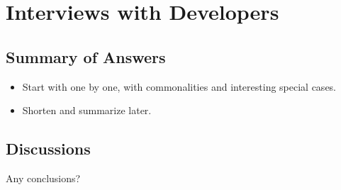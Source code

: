 \chapter{Interviews with Developers}
\label{ch_interviews}

\section{Summary of Answers}

\begin{itemize}
\item Start with one by one, with commonalities and interesting special cases.

\item Shorten and summarize later.
\end{itemize}

\section{Discussions}

Any conclusions?
